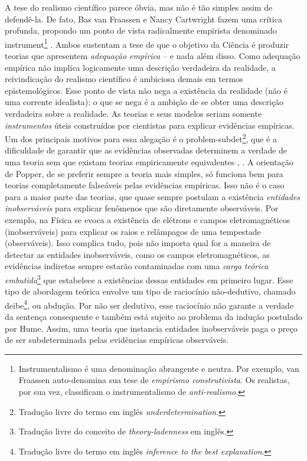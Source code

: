 \documentclass[./main.tex]{subfiles}
\begin{document}
\par A tese do realismo científico parece óbvia, mas não é tão simples assim de defendê-la. De fato, Bas van Fraassen \cite{bas1980} e Nancy Cartwright \cite{nancy1983} fazem uma crítica profunda, propondo um ponto de vista radicalmente empirista denominado \gls{instrument}\footnote{Instrumentalismo é uma denominação  abrangente e neutra. Por exemplo, van Fraassen auto-denomina sua tese de \textit{empirismo construtivista}. Os realistas, por sua vez, classificam o instrumentalismo de \textit{anti-realismo}.} \cite{sep-constructive-empiricism}. Ambos sustentam a tese de que o objetivo da Ciência é produzir teorias que apresentem \textit{adequação empírica} -- e nada além disso. Como adequação empírica não implica logicamente uma descrição verdadeira da realidade, a reivindicação do realismo científico é ambiciosa demais em termos epistemológicos. Esse ponto de vista não nega a existência da realidade (não é uma corrente idealista): o que se nega é a ambição de se obter uma descrição verdadeira sobre a realidade. As teorias e seus modelos seriam somente \textit{instrumentos} úteis construídos por cientistas para explicar evidências empíricas. Um dos principais motivos para essa alegação é o \gls{problem-subdet}\footnote{Tradução livre do termo em inglês \textit{underdetermination}.}, que é a dificuldade de garantir que as evidências observadas determinem a verdade de uma teoria sem que existam teorias empiricamente equivalentes \cite{sep-scientific-underdet}, \cite{Tulodziecki2017}. A orientação de Popper, de se preferir sempre a teoria mais simples, só funciona bem para teorias completamente falseáveis pelas evidências empíricas. Isso não é o caso para a maior parte das teorias, que quase sempre postulam a existência \textit{entidades inobserváveis} para explicar fenômenos que são diretamente observáveis. Por exemplo, na Física se evoca a existência de elétrons e campos eletromagnéticos (inobserváveis) para explicar os raios e relâmpagos de uma tempestade (observáveis). Isso complica tudo, pois não importa qual for a maneira de detectar as entidades inobserváveis, como os campos eletromagnéticos, as evidências indiretas sempre estarão contaminadas com uma \textit{carga teórica embutida}\footnote{Tradução livre do conceito de \textit{theory-ladenness} em inglês.} que estabelece a existências dessas entidades em primeiro lugar. Esse tipo de abordagem teórica envolve um tipo de raciocínio não-dedutivo, chamado de\gls{ibe}\footnote{Tradução livre do termo em inglês \textit{inference to the best explanation}.}, ou abdução. Por não ser dedutivo, esse raciocínio não garante a verdade da sentença consequente e também está sujeito ao problema da indução postulado por Hume. Assim, uma teoria que instancia entidades inobserváveis paga o preço de ser subdeterminada pelas evidências empíricas observáveis.
\end{document}
